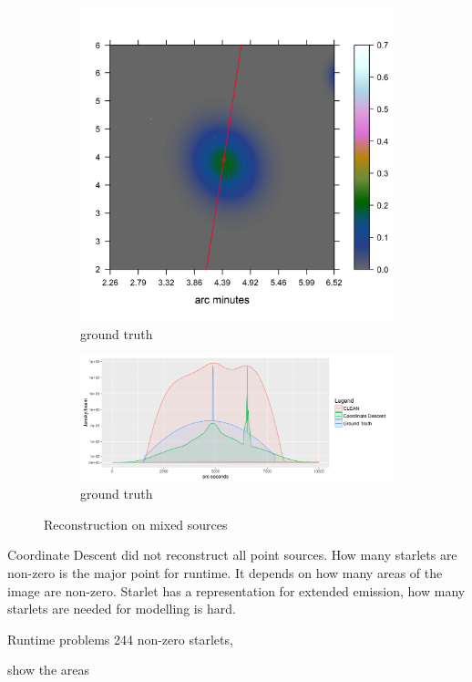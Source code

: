 \begin{figure}[h]
	\centering
	\begin{subfigure}[b]{0.3\linewidth}
		\includegraphics[width=\linewidth, trim={0.2in, 0.2in, 3.2in, 0.2in}, clip]{./chapters/20.results/mixed/mixed_cut_model2_line.png}
		\caption{ground truth}
		\label{results:mixed:cut0}
	\end{subfigure}
	\begin{subfigure}[b]{0.6\linewidth}
		\includegraphics[width=\linewidth, trim={0.2in, 0.2in, 0, 0.2in}, clip]{./chapters/20.results/mixed/mixed_cut2.png}
		\caption{ground truth}
		\label{results:mixed:cut0}
	\end{subfigure}
	\caption{Reconstruction on mixed sources}
	\label{results:mixed:contour}
\end{figure}


Coordinate Descent did not reconstruct all point sources. How many starlets are non-zero is the major point for runtime. It depends on how many areas of the image are non-zero. Starlet has a representation for extended emission, how many starlets are needed for modelling is hard.

Runtime problems
244 non-zero starlets, 

show the areas


